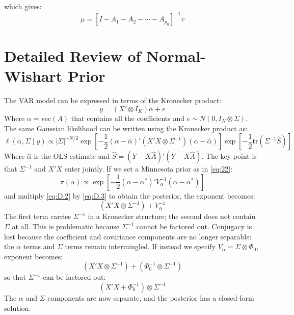 \documentclass[12pt, a4paper]{article}
\begin{document}
which gives: 
\begin{equation}
\mu = [I-A_1-A_2-\cdots-A_{p_0}]^{-1}v  
\end{equation}

\section{Detailed Review of Normal-Wishart Prior}
\label{sec:normal_wishart}

The VAR model can be expressed in terms of the Kronecker product:
\begin{equation} \label{eq:D.1}
y = (X' \otimes I_K){\alpha} + e
\end{equation}
Where $\alpha = \text{vec}(A)$ that contains all the coefficients and $e \sim N(0, I_N \otimes \Sigma)$. The same Gaussian likelihood can be written using the Kronecker product as:
\begin{equation} \label{eq:D.2}
\ell(\alpha, \Sigma \mid y) \propto |\Sigma|^{-N/2} \exp \left[ -\frac{1}{2}(\alpha - \hat{\alpha})'(X'X \otimes \Sigma^{-1})(\alpha - \hat{\alpha}) \right] \exp \left[ -\frac{1}{2}\text{tr}(\Sigma^{-1}\hat{S}) \right]
\end{equation}
Where $\hat \alpha$ is the OLS estimate and $\hat S = (Y - X\hat{A})'(Y-X\hat{A})$. The key point is that $\Sigma ^{-1}$ and $X'X$ enter jointly. If we set a Minnesota prior as in \eqref{eq:22}:
\begin{equation} \label{eq:D.3}
\pi(\alpha) \propto \exp \left[ -\frac{1}{2}(\alpha - \alpha^*)' V_\alpha^{-1} (\alpha - \alpha^*) \right]
\end{equation}
and multiply \eqref{eq:D.2} by \eqref{eq:D.3} to obtain the posterior, the exponent becomes:
\begin{equation} \label{eq:D.4}
(X'X \otimes \Sigma^{-1}) + V_\alpha^{-1}
\end{equation}
The first term carries $\Sigma^{-1}$ in a Kronecker structure; the second does not contain $\Sigma$ at all. This is problematic because $\Sigma^{-1}$ cannot be factored out. Conjugacy is lost because the coefficient and covariance components are no longer separable: the $\alpha$ terms and $\Sigma$ terms remain intermingled. If instead we specify $V_{\alpha} = \Sigma \otimes \Phi_0$, exponent becomes:
\begin{equation} \label{eq:D.5}
(X'X \otimes \Sigma^{-1}) + (\Phi_0^{-1} \otimes \Sigma^{-1})
\end{equation}
so that $\Sigma^{-1}$ can be factored out:
\begin{equation} \label{eq:D.6}
(X'X + \Phi_0^{-1}) \otimes \Sigma^{-1}
\end{equation}
The $\alpha$ and $\Sigma$ components are now separate, and the posterior has a closed-form solution. 
\end{document}
